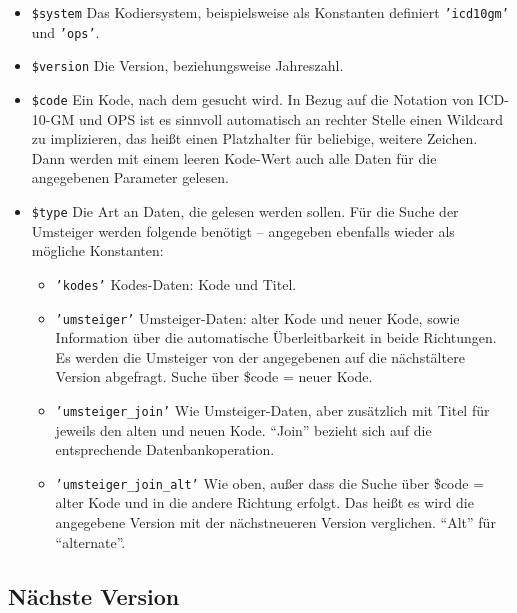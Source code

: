 \begin{itemize}
\item \texttt{\$system} \newline Das Kodiersystem, beispielsweise als Konstanten definiert \texttt{'icd10gm'} und \texttt{'ops'}. 
\item \texttt{\$version} \newline Die Version, beziehungsweise Jahreszahl.
\item \texttt{\$code} \newline Ein Kode, nach dem gesucht wird. In Bezug auf die Notation von ICD-10-GM und OPS ist es sinnvoll automatisch an rechter Stelle einen Wildcard zu implizieren, das heißt einen Platzhalter für beliebige, weitere Zeichen. Dann werden mit einem leeren Kode-Wert auch alle Daten für die angegebenen Parameter gelesen. 
\item \texttt{\$type} \newline Die Art an Daten, die gelesen werden sollen. Für die Suche der Umsteiger werden folgende benötigt -- angegeben ebenfalls wieder als mögliche Konstanten:
  \begin{itemize}
  \item \texttt{'kodes'} \newline Kodes-Daten: Kode und Titel. 
  \item \texttt{'umsteiger'} \newline Umsteiger-Daten: alter Kode und neuer Kode, sowie Information über die automatische Überleitbarkeit in beide Richtungen. Es werden die Umsteiger von der angegebenen auf die nächstältere Version abgefragt. Suche über \${code} = neuer Kode. 
  \item \texttt{'umsteiger\_join'} \newline Wie Umsteiger-Daten, aber zusätzlich mit Titel für jeweils den alten und neuen Kode. "`Join"' bezieht sich auf die entsprechende Datenbankoperation.
  \item \texttt{'umsteiger\_join\_alt'} \newline Wie oben, außer dass die Suche über \${code} = alter Kode und in die andere Richtung erfolgt. Das heißt es wird die angegebene Version mit der nächstneueren Version verglichen. "`Alt"' für "`alternate"'.
  \end{itemize}
\end{itemize}

\subsection{Nächste Version}

